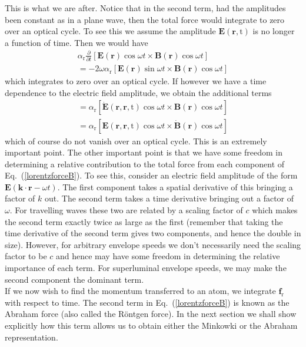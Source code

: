 This is what we are after. Notice that in the second term, had the amplitudes been constant as in a plane wave, then the total force would integrate to zero over an optical cycle.  To see this we assume the amplitude $\mathbf{E}(\mathbf{r},\mathrm{t})$ is no longer a function of time.  Then we would have
\begin{align}
&\alpha_{\mathrm{r}}\frac{\partial}{\partial t}\left[\mathbf{E}(\mathbf{r})\cos{\omega t}\times\mathbf{B}(\mathbf{r})\cos{\omega t}\right]& \nonumber \\
&=-2\omega\alpha_{\mathrm{r}}\left[\mathbf{E}(\mathbf{r})\sin{\omega t}\times\mathbf{B}(\mathbf{r})\cos{\omega t}\right]&
\label{lorentzforceC}
\end{align}
which integrates to zero over an optical cycle.  If however we have a time dependence to the electric field amplitude, we obtain the additional terms 
\begin{align}
&=\alpha_{\mathrm{r}}\left[\dot{\mathbf{E}}(\mathbf{r},\mathbf{r},\mathrm{t})\cos{\omega t}\times\mathbf{B}(\mathbf{r})\cos{\omega t}\right]& \nonumber \\
&=\alpha_{\mathrm{r}}\left[\mathbf{E}(\mathbf{r},\mathbf{r},\mathrm{t})\cos{\omega t}\times\dot{\mathbf{B}}(\mathbf{r})\cos{\omega t}\right]&
\label{lorentzforceD}
\end{align}
which of course do not vanish over an optical cycle. This is an extremely important point.  The other important point is that we have some freedom in determining a relative contribution to the total force from each component of Eq.\ (\ref{lorentzforceB}).  To see this, consider an electric field amplitude of the form $\mathbf{E}(\mathbf{k}\cdot\mathbf{r}-\omega t)$.  The first component takes a spatial derivative of this bringing a factor of $k$ out.  The second term takes a time derivative bringing out a factor of $\omega$.  For travelling waves these two are related by a scaling factor of $c$ which makes the second term exactly twice as large as the first (remember that taking the time derivative of the second term gives two components, and hence the double in size). However, for arbitrary envelope speeds we don't necessarily need the scaling factor to be $c$ and hence may have some freedom in determining the relative importance of each term. For superluminal envelope speeds, we may make the second component the dominant term. \\
If we now wish to find the momentum transferred to an atom, we integrate $\mathbf{f}_{\mathrm{r}}$ with respect to time.  The second term in Eq.\ (\ref{lorentzforceB}) is known as the Abraham force (also called the R\"{o}ntgen force). In the next section we shall show explicitly how this term allows us to obtain either the Minkowki or the Abraham representation.  \\
